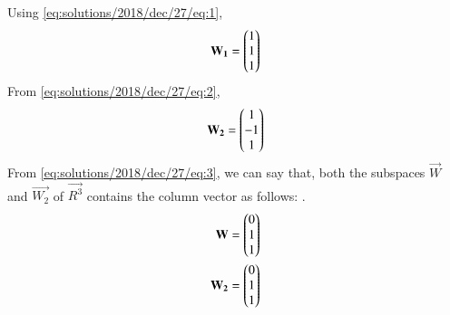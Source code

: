 Using \eqref{eq:solutions/2018/dec/27/eq:1},
\begin{align}
\mathbf{W_1}=\begin{pmatrix}1 \\ 1 \\ 1\end{pmatrix} \label{eq:solutions/2018/dec/27/eq:5}
\end{align}
From \eqref{eq:solutions/2018/dec/27/eq:2},
\begin{align}
\mathbf{W_2}=\begin{pmatrix}1 \\ -1 \\ 1\end{pmatrix} \label{eq:solutions/2018/dec/27/eq:6}
\end{align}
From \eqref{eq:solutions/2018/dec/27/eq:3}, we can say that, both the subspaces $\vec{W}$ and $\vec{W_2}$ of $\vec{R^3}$ contains the column vector as follows: .
\begin{align}
\mathbf{W}=\begin{pmatrix}0 \\ 1 \\ 1\end{pmatrix} \label{eq:solutions/2018/dec/27/eq:7} \\ \mathbf{W_2}=\begin{pmatrix}0 \\ 1 \\ 1\end{pmatrix}  \label{eq:solutions/2018/dec/27/eq:8}
\end{align}
